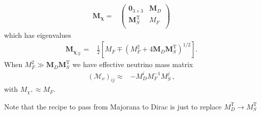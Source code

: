 \begin{align}
  \boldsymbol{M_{\chi}}=& \begin{pmatrix}
   \mathbf{0}_{3 \times 3} &            \boldsymbol{M}_D \\
   \boldsymbol{M}_S^{\operatorname{T}} & M_F \\
 \end{pmatrix}
\end{align}
which has eigenvalues
\begin{align}
{  \boldsymbol{M_{\chi}}}_\mp=&\frac{1}{2} \left[ M_F \mp \left( M_F^2 + 4   \boldsymbol{M}_D   \boldsymbol{M}_S^{\operatorname{T}}  \right)^{1/2} \right].
\end{align}
When $M_F^2 \gg \boldsymbol{M}_D  \boldsymbol{M}_S ^{\operatorname{T}} $ we have effective neutrino mass matrix
\begin{align}
 \left( \mathcal{M}_{\nu} \right)_{ij} \approx&-   M_D^i M_F^{-1} M_S^j     \,,
\end{align}
with $ M_{\chi^+} \approx M_F$.

Note that the recipe to pass from Majorana to Dirac is just to replace $M_D^{\operatorname{T}}\to M_S^{\operatorname{T}} $

